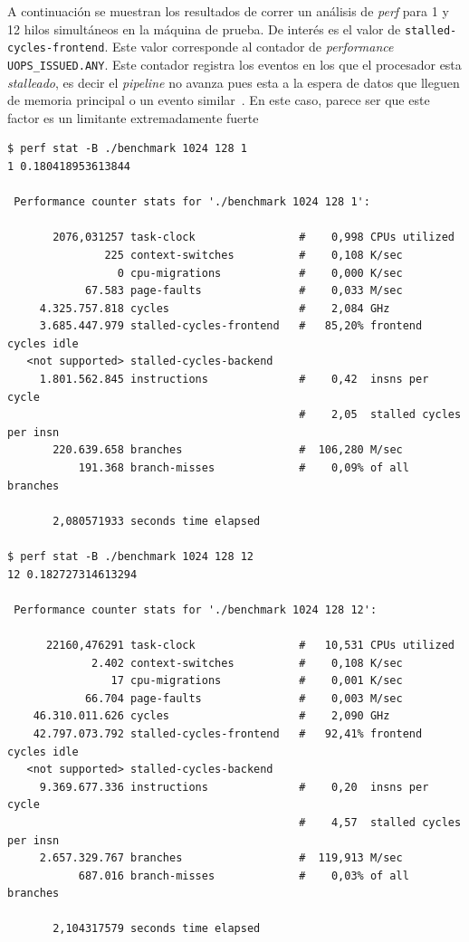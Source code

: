 
A continuaci\'on se muestran los resultados de correr
un an\'alisis de \textit{perf} para 1 y 12 hilos simult\'aneos en la m\'aquina de
prueba. De inter\'es es el valor de \texttt{stalled-cycles-frontend}. Este valor
corresponde al contador de \textit{performance} \texttt{UOPS\_ISSUED.ANY}. Este
contador registra los eventos en los que el procesador esta \textit{stalleado},
es decir el \textit{pipeline } no avanza pues esta a la espera de datos que
lleguen de memoria principal o un evento similar~\cite{Intel3B}. En este
caso, parece ser que este factor es un limitante extremadamente fuerte

{\footnotesize
\begin{verbatim}
$ perf stat -B ./benchmark 1024 128 1
1 0.180418953613844

 Performance counter stats for './benchmark 1024 128 1':

       2076,031257 task-clock                #    0,998 CPUs utilized
               225 context-switches          #    0,108 K/sec
                 0 cpu-migrations            #    0,000 K/sec
            67.583 page-faults               #    0,033 M/sec
     4.325.757.818 cycles                    #    2,084 GHz
     3.685.447.979 stalled-cycles-frontend   #   85,20% frontend cycles idle
   <not supported> stalled-cycles-backend
     1.801.562.845 instructions              #    0,42  insns per cycle
                                             #    2,05  stalled cycles per insn
       220.639.658 branches                  #  106,280 M/sec
           191.368 branch-misses             #    0,09% of all branches

       2,080571933 seconds time elapsed

$ perf stat -B ./benchmark 1024 128 12
12 0.182727314613294

 Performance counter stats for './benchmark 1024 128 12':

      22160,476291 task-clock                #   10,531 CPUs utilized
             2.402 context-switches          #    0,108 K/sec
                17 cpu-migrations            #    0,001 K/sec
            66.704 page-faults               #    0,003 M/sec
    46.310.011.626 cycles                    #    2,090 GHz
    42.797.073.792 stalled-cycles-frontend   #   92,41% frontend cycles idle
   <not supported> stalled-cycles-backend
     9.369.677.336 instructions              #    0,20  insns per cycle
                                             #    4,57  stalled cycles per insn
     2.657.329.767 branches                  #  119,913 M/sec
           687.016 branch-misses             #    0,03% of all branches

       2,104317579 seconds time elapsed
\end{verbatim}
}

